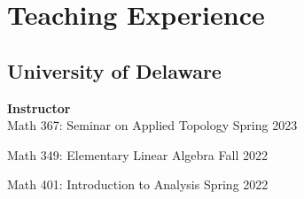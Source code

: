 \documentclass[10pt,letterpaper]{article}
\renewenvironment{itemize}{
  \begin{list}{}{
    \setlength{\leftmargin}{1.5em}
    \setlength{\itemsep}{0.25em}
    \setlength{\parskip}{0pt}
    \setlength{\parsep}{0.25em}
  }
}{
  \end{list}
}
\begin{document}
\section*{Teaching Experience}

\subsection*{University of Delaware}
\begin{itemize}
\item {\bf {\fontsize{11}{11}\selectfont Instructor}}\\
{Math 367: Seminar on Applied Topology \hfill Spring 2023}

{Math 349: Elementary Linear Algebra \hfill Fall 2022}

{Math 401: Introduction to Analysis} \hfill Spring 2022
\end{itemize}
\end{document}
